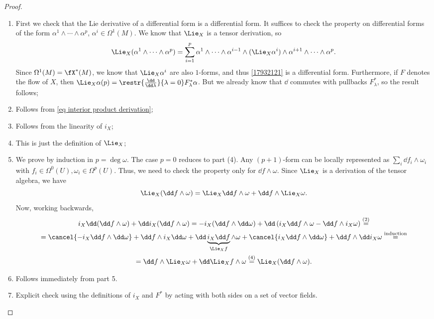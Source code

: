 \begin{proof}
\begin{enumerate}
    \item First we check that the Lie derivative of a differential form is a differential form. It suffices to check the property on differential forms of the form $\alpha^1\wedge\cdots\wedge\alpha^p$, $\alpha^i\in\Omega^1(M)$. We know that $\Lie_X$ is a tensor derivation, so 
    \[\Lie_X (\alpha^1\wedge\cdots\wedge\alpha^p)=\sum_{i=1}^p \alpha^1\wedge\cdots\wedge\alpha^{i-1}\wedge(\Lie_X\alpha^i)\wedge\alpha^{i+1}\wedge\cdots\wedge\alpha^p.\label{17932121}\]
    Since $\Omega^1(M)=\fX^\ast(M)$, we know that $\Lie_X \alpha^i$ are also $1$-forms, and thus \eqref{17932121} is a differential form.
    Furthermore, if $F$ denotes the flow of $X$, then $\Lie_X\alpha (p)=\restr{\frac{\dd}{\dd\lambda}}{\lambda=0}F^\ast_\lambda \alpha$. But we already know that $\dd$ commutes with pullbacks $F^\ast_\lambda$, so the result follows;
    \item Follows from \eqref{eq interior product derivation};
    \item Follows from the linearity of $i_X$;
    \item This is just the definition of $\Lie_X$;
    \item We prove by induction in $p=\deg\omega$. The case $p=0$ reduces to part (4). Any $(p+1)$-form can be locally represented as $\sum_i \dd f_i\wedge \omega_i$ with $f_i\in\Omega^0(U), \omega_i\in \Omega^p(U)$. Thus, we need to check the property only for $\dd f\wedge \omega$. Since $\Lie_X$ is a derivation of the tensor algebra, we have
    \[\Lie_X(\dd f\wedge\omega)=\Lie_X \dd f\wedge \omega+\dd f\wedge \Lie_X\omega.\]
    Now, working backwards,
    \begin{multline}
        i_X\dd (\dd f\wedge \omega)+ \dd i_X (\dd f\wedge\omega)=-i_X(\dd f\wedge\dd \omega)+\dd\left(i_X\dd f\wedge\omega-\dd f\wedge i_X\omega\right)\overset{(2)}{=}
        \\
        =\cancel{-i_X\dd f\wedge\dd \omega}+\dd f\wedge i_X\dd\omega +\dd \underbrace{i_X \dd f}_{\Lie_X f}\wedge\omega+\cancel{i_X\dd f\wedge\dd \omega}+\dd f\wedge \dd i_X\omega\overset{\text{induction}}{=}
        \\
        =\dd f\wedge \Lie_X\omega +\dd \Lie_X f\wedge \omega\overset{(4)}{=}\Lie_X(\dd f\wedge\omega).
    \end{multline}
    \item Follows immediately from part 5.
    \item Explicit check using the definitions of $i_X$ and $F^\ast$ by acting with both sides on a set of vector fields.
\end{enumerate}
\end{proof}

